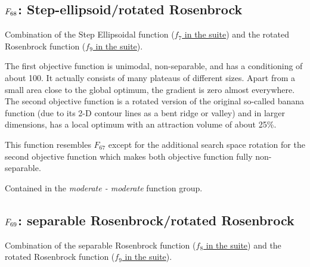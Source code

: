 \subsection[\texorpdfstring{\protect\(F_{68}\protect\): Step-ellipsoid/rotated Rosenbrock}{F68: Step-ellipsoid/rotated Rosenbrock}]{\texorpdfstring{\protect\(F_{68}\protect\): Step-ellipsoid/rotated Rosenbrock}{}}
\label{index:step-ellipsoid-rotated-rosenbrock}\label{index:f68}
Combination of the Step Ellipsoidal function (\href{https://coco.gforge.inria.fr/downloads/download16.00/bbobdocfunctions.pdf\#page=35}{\(f_7\) in the \bbob suite}) and the
rotated Rosenbrock function (\href{https://coco.gforge.inria.fr/downloads/download16.00/bbobdocfunctions.pdf\#page=45}{\(f_9\) in the \bbob suite}).

The first objective function is unimodal, non-separable, and has a
conditioning of about 100. It actually consists of many plateaus of different sizes.
Apart from a small area close to the global optimum, the gradient is zero almost everywhere.
The second objective function is a rotated version of the original
so-called banana function (due to its 2-D contour lines as a bent ridge or valley) and
in larger dimensions, has a local optimum with an attraction volume of about 25\%.

This function resembles \(F_{67}\) except for the additional search space
rotation for the second objective function which makes both objective
function fully non-separable.

Contained in the \emph{moderate - moderate} function group.



\subsection[\texorpdfstring{\protect\(F_{69}\protect\): separable Rosenbrock/rotated Rosenbrock}{F69: separable Rosenbrock/rotated Rosenbrock}]{\texorpdfstring{\protect\(F_{69}\protect\): separable Rosenbrock/rotated Rosenbrock}{}}
\label{index:separable-rosenbrock-rotated-rosenbrock}\label{index:f69}
Combination of the separable Rosenbrock function (\href{https://coco.gforge.inria.fr/downloads/download16.00/bbobdocfunctions.pdf\#page=40}{\(f_8\) in the \bbob suite}) and the
rotated Rosenbrock function (\href{https://coco.gforge.inria.fr/downloads/download16.00/bbobdocfunctions.pdf\#page=45}{\(f_9\) in the \bbob suite}).


